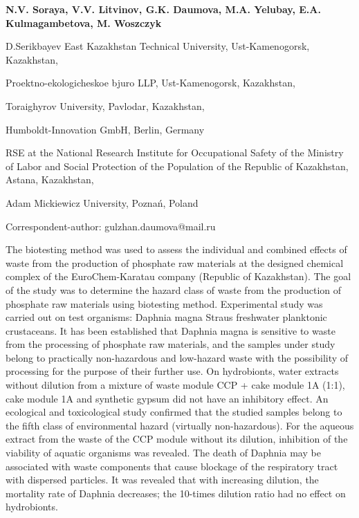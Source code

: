 
\begin{header}

{\bfseries
{}N.V. Soraya,
V.V. Litvinov,
G.K. Daumova\envelope,
M.A. Yelubay,
E.A. Kulmagambetova,
M. Woszczyk
}
\end{header}

\begin{affil}
D.Serikbayev East Kazakhstan Technical University, Ust-Kamenogorsk, Kazakhstan,

Proektno-ekologicheskoe bjuro LLP, Ust-Kamenogorsk, Kazakhstan,

Toraighyrov University, Pavlodar, Kazakhstan,

Humboldt-Innovation GmbH, Berlin, Germany

RSE at the National Research Institute for Occupational Safety of the Ministry of Labor and Social Protection of the Population of the Republic of Kazakhstan, Astana, Kazakhstan,

Adam Mickiewicz University, Poznań, Poland

\envelope Correspondent-author: gulzhan.daumova@mail.ru
\end{affil}

The biotesting method was used to assess the individual and combined
effects of waste from the production of phosphate raw materials at the
designed chemical complex of the EuroChem-Karatau company (Republic of
Kazakhstan). The goal of the study was to determine the hazard class of
waste from the production of phosphate raw materials using biotesting
method. Experimental study was carried out on test organisms: Daphnia
magna Straus freshwater planktonic crustaceans. It has been established
that Daphnia magna is sensitive to waste from the processing of
phosphate raw materials, and the samples under study belong to
practically non-hazardous and low-hazard waste with the possibility of
processing for the purpose of their further use. On hydrobionts, water
extracts without dilution from a mixture of waste module CCP + cake
module 1A (1:1), cake module 1A and synthetic gypsum did not have an
inhibitory effect. An ecological and toxicological study confirmed that
the studied samples belong to the fifth class of environmental hazard
(virtually non-hazardous). For the aqueous extract from the waste of the
CCP module without its dilution, inhibition of the viability of aquatic
organisms was revealed. The death of Daphnia may be associated with
waste components that cause blockage of the respiratory tract with
dispersed particles. It was revealed that with increasing dilution, the
mortality rate of Daphnia decreases; the 10-times dilution ratio had no
effect on hydrobionts.

